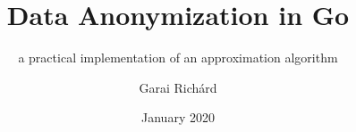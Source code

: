 \documentclass{beamer}
\title{Data Anonymization in Go}
\subtitle{\footnotesize{a practical implementation of an approximation algorithm}}
\date{January 2020}
\author{Garai Richárd}
\institute[BME / AUT]{
  \footnotesize{Supervisor: Dr.\ Dudás Ákos} \\[0.5\baselineskip]
  BME / AUT
}
\begin{document}
\frame{\titlepage}






\end{document}
